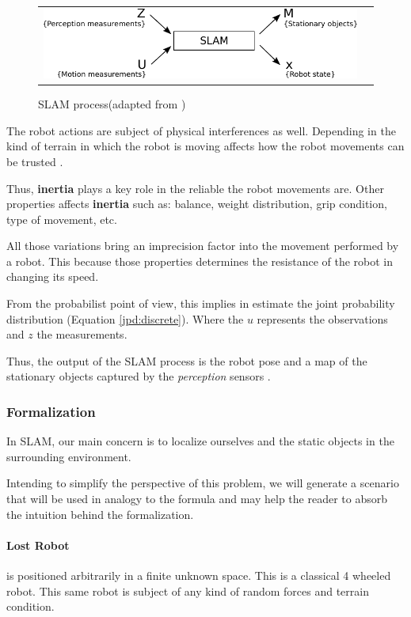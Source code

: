 \begin{figure}[h]
   \centering
     \begin{tabular}{lr}
       \includegraphics[scale=0.9]{img/fig:perception:slam}
     \end{tabular}
   \caption{SLAM process(adapted from \cite{Wang04a})}
   \label{fig:perception:slam}
\end{figure}

The robot actions are subject of physical interferences as well. Depending in the kind of terrain in which the robot is moving affects how the robot movements can be trusted \cite{DBLP:conf/icra/LenainTHM11}. 

Thus, \textbf{inertia} plays a key role in the reliable the robot movements are. Other properties affects \textbf{inertia} such as: balance, weight distribution, grip condition, type of movement, etc.

All those variations bring an imprecision factor into the movement performed by a robot. This because those properties determines the resistance of the robot in changing its speed.

From the probabilist point of view, this implies in estimate the joint probability distribution (Equation \ref{jpd:discrete}). Where the $u$ represents the observations and $z$ the measurements.

Thus, the output of the SLAM process is the robot pose and a map of the stationary objects captured by the \textit{perception} sensors \cite{iyengar1991autonomous}.

\subsubsection{Formalization}

In SLAM, our main concern is to localize ourselves and the static objects in the surrounding environment. 

Intending to simplify the perspective of this problem, we will generate a scenario that will be used in analogy to the formula and may help the reader to absorb the intuition behind the formalization.

\paragraph*{Lost Robot} is positioned arbitrarily in a finite unknown space. This is a classical 4 wheeled robot. This same robot is subject of any kind of random forces and terrain condition. 

